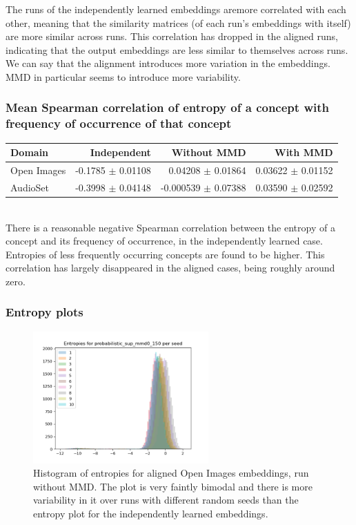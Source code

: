 The runs of the independently learned embeddings aremore correlated with each other, meaning that the similarity matrices (of each run's embeddings with itself) are more similar across runs. This correlation has dropped in the aligned runs, indicating that the output embeddings are less similar to themselves across runs. We can say that the alignment introduces more variation in the embeddings. MMD in particular seems to introduce more variability. 

\subsubsection{Mean Spearman correlation of entropy of a concept with frequency of occurrence of that concept}
\begin{tabular}{lrrr}
\toprule
Domain &   Independent & Without MMD &  With MMD \\
\midrule
Open Images    &  -0.1785 $\pm$ 0.01108 & 0.04208 $\pm$ 0.01864 &     0.03622 $\pm$  0.01152 \\
AudioSet    &  -0.3998 $\pm$ 0.04148 & -0.000539 $\pm$   0.07388 &      0.03590  $\pm$ 0.02592  \\
\bottomrule
\end{tabular}\\

There is a reasonable negative Spearman correlation between the entropy of a concept and its frequency of occurrence, in the independently learned case. Entropies of less frequently occurring concepts are found to be higher. This correlation has largely disappeared in the aligned cases, being roughly around zero. 

\newpage
\subsubsection{Entropy plots}

\begin{figure}[H]
    \centering
    \includegraphics[width=0.6\textwidth]{images/method/probabilistic_aligned/openimages/probabilistic_sup_mmd0_150_entropies.png}
    \caption{
        Histogram of entropies for aligned Open Images embeddings, run without MMD. The plot is very faintly bimodal and there is more variability in it over runs with different random seeds than the entropy plot for the independently learned embeddings. 
    }
\end{figure}


